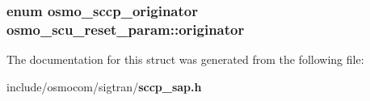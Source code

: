 \subsubsection[{originator}]{\setlength{\rightskip}{0pt plus 5cm}enum {\bf osmo\+\_\+sccp\+\_\+originator} osmo\+\_\+scu\+\_\+reset\+\_\+param\+::originator}\label{structosmo__scu__reset__param_ae1a1b23126ae9280b4ded660f8a40935}


The documentation for this struct was generated from the following file\+:\begin{DoxyCompactItemize}
\item 
include/osmocom/sigtran/{\bf sccp\+\_\+sap.\+h}\end{DoxyCompactItemize}
